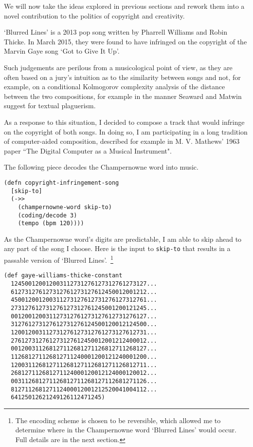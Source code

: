 \documentclass[numbers]{sigplanconf}
\begin{document}
We will now take the ideas explored in previous sections and rework them into a novel contribution to the politics of
copyright and creativity.

`Blurred Lines' is a 2013 pop song written by Pharrell Williams and Robin Thicke\cite{Blurred Lines}. In March 2015,
they were found to have infringed on the copyright of the Marvin Gaye song
`Got to Give It Up'\cite{Got to Give It Up, USA Today}.

Such judgements are perilous from a musicological point of view, as they are often based on a jury's intuition as to
the similarity between songs and not, for example, on a conditional Kolmogorov complexity analysis of the distance between
the two compositions, for example in the manner Seaward and Matwin suggest for textual plaguerism\cite{Intrinsic Plaguerism Detection}.

As a response to this situation, I decided to compose a track that would infringe on the copyright of both songs. In doing so, I
am participating in a long tradition of computer-aided composition, described for example in M. V. Mathews' 1963 paper
``The Digital Computer as a Musical Instrument"\cite{The Digital Computer as a Musical Instrument}.

The following piece decodes the Champernowne word into music.

\begin{verbatim}
(defn copyright-infringement-song
  [skip-to]
  (->>
    (champernowne-word skip-to)
    (coding/decode 3)
    (tempo (bpm 120))))
\end{verbatim}

As the Champernowne word's digits are predictable, I am able to skip ahead to any part of the song I choose. Here
is the input to \verb|skip-to| that results in a passable version of `Blurred Lines'.~\footnote{The encoding scheme is chosen
to be reversible, which allowed me to determine where in the Champernowne word `Blurred Lines' would occur. Full details are in the next section.}

\begin{verbatim}
(def gaye-williams-thicke-constant
  124500120012003112731276127312761273127...
  612731276127312761273127612450012001212...
  450012001200311273127612731276127312761...
  273127612731276127312761245001200121245...
  001200120031127312761273127612731276127...
  312761273127612731276124500120012124500...
  120012003112731276127312761273127612731...
  276127312761273127612450012001212400012...
  001200311268127112681271126812711268127...
  112681271126812711240001200121240001200...
  120031126812711268127112681271126812711...
  268127112681271124000120012124000120012...
  003112681271126812711268127112681271126...
  812711268127112400012001212520041004112...
  64125012621249126112471245)
\end{verbatim}
\end{document}
